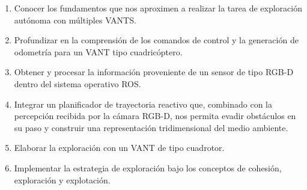 \begin{enumerate}\setlength{\itemsep}{-1mm}
\item Conocer los fundamentos que nos aproximen a realizar la tarea de exploración autónoma con múltiples VANTS.
  \item Profundizar en la comprensión de los comandos de control y la generación de odometría para un VANT tipo cuadricóptero.
  \item Obtener y procesar la información proveniente de un sensor de tipo RGB-D dentro del sistema operativo ROS.
  \item Integrar un planificador de trayectoria reactivo que, combinado con la percepción recibida por la cámara RGB-D, nos permita evadir obstáculos en su paso y construir una representación tridimensional del medio ambiente.
  \item Elaborar la exploración con un VANT de tipo cuadrotor.
  \item Implementar la estrategia de exploración bajo los conceptos de cohesión, exploración y explotación.
\end{enumerate}


